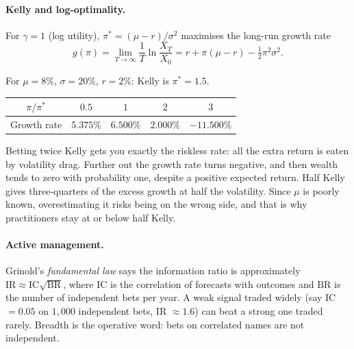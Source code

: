 \paragraph{Kelly and log-optimality.} For $\gamma=1$ (log utility), $\pi^*=(\mu-r)/\sigma^2$ maximises the long-run growth rate
\[
g(\pi)=\lim_{T\to\infty}\frac1T\ln\frac{X_T}{X_0}=r+\pi(\mu-r)-\tfrac12\pi^2\sigma^2.
\]
\begin{numcheck}
For $\mu=8\%$, $\sigma=20\%$, $r=2\%$: Kelly is $\pi^*=1.5$.
\begin{center}
\begin{tabular}{ccccc}
\toprule
$\pi/\pi^*$ & $0.5$ & $1$ & $2$ & $3$\\
\midrule
Growth rate & $5.375\%$ & $6.500\%$ & $2.000\%$ & $-11.500\%$\\
\bottomrule
\end{tabular}
\end{center}
Betting twice Kelly gets you exactly the riskless rate: all the extra return is eaten by volatility drag. Further out the growth rate turns negative, and then wealth tends to zero with probability one, despite a positive expected return. Half Kelly gives three-quarters of the excess growth at half the volatility. Since $\mu$ is poorly known, overestimating it risks being on the wrong side, and that is why practitioners stay at or below half Kelly.
\end{numcheck}

\paragraph{Active management.} Grinold's \emph{fundamental law} says the information ratio is approximately $\mathrm{IR}\approx\mathrm{IC}\sqrt{\mathrm{BR}}$, where $\mathrm{IC}$ is the correlation of forecasts with outcomes and $\mathrm{BR}$ is the number of independent bets per year. A weak signal traded widely (say IC $=0.05$ on $1{,}000$ independent bets, IR $\approx1.6$) can beat a strong one traded rarely. Breadth is the operative word: bets on correlated names are not independent.

